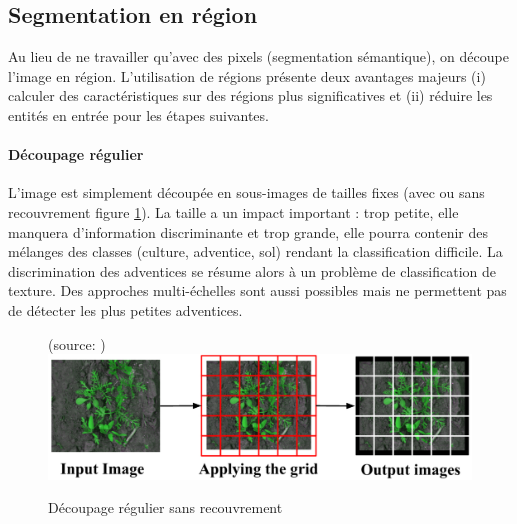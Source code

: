 \documentclass[../thesis.tex]{subfiles}
\begin{document}
    
    \newpage
    \subsection{Segmentation en région} 
    
    Au lieu de ne travailler qu'avec des pixels (segmentation sémantique), on découpe l'image en région. L'utilisation de régions présente deux avantages majeurs (i) calculer des caractéristiques sur des régions plus significatives et (ii) réduire les entités en entrée pour les étapes suivantes.
    
    \paragraph{Découpage régulier} L'image est simplement découpée en sous-images de tailles fixes (avec ou sans recouvrement figure \ref{fig:03-patch-segmentation}). La taille a un impact important : trop petite, elle manquera d'information discriminante et trop grande, elle pourra contenir des mélanges des classes (culture, adventice, sol) rendant la classification difficile. La discrimination des adventices se résume alors à un problème de classification de texture. Des approches multi-échelles sont aussi possibles \cite{HU2020105520} mais ne permettent pas de détecter les plus petites adventices.	
    
    \begin{figure}[H]
        \centering
        {\scriptsize (source: \cite{brilhador2019classification})} \\
        \includegraphics[width=0.7\linewidth]{img/biblio/patch-segmentation}
        \caption{Découpage régulier sans recouvrement}
        \label{fig:03-patch-segmentation}
    \end{figure}
    
\end{document}
